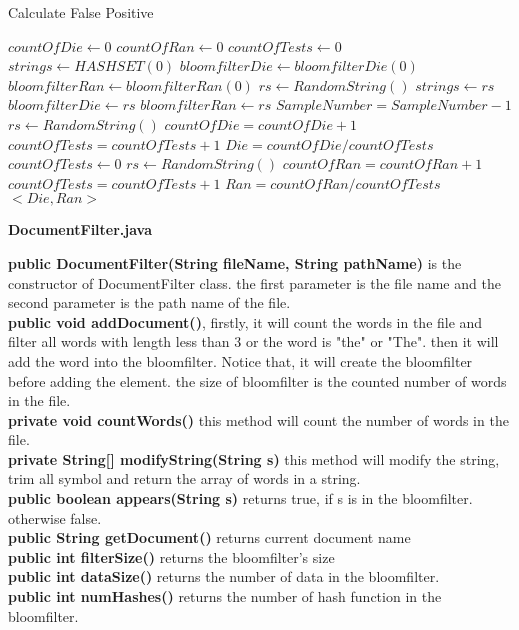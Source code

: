 \documentclass[a4paper,14pt]{article}
\begin{document}
\begin{algorithm}
\caption{Calculate False Positive}
\begin{algorithmic}
\STATE $countOfDie \gets 0$
\STATE$countOfRan \gets 0$
\STATE$countOfTests \gets 0$
\STATE$strings \gets HASHSET(0)$
\STATE$bloomfilterDie \gets bloomfilterDie(0)$
\STATE$bloomfilterRan \gets bloomfilterRan(0)$
\STATE $rs \gets RandomString()$
\STATE$strings \gets rs$
\STATE$bloomfilterDie \gets rs$
\STATE$bloomfilterRan \gets rs$
\STATE$SampleNumber = SampleNumber - 1$
\ENDWHILE
{}
\STATE $rs \gets RandomString()$
\STATE$countOfDie = countOfDie + 1 $
\ENDIF
\STATE$countOfTests = countOfTests + 1 $
\ENDWHILE
\STATE$Die = countOfDie / countOfTests$
\STATE $countOfTests \gets 0$
\STATE $rs \gets RandomString()$
\STATE$countOfRan = countOfRan + 1 $
\ENDIF
\STATE$countOfTests = countOfTests + 1 $
\ENDWHILE
\STATE$Ran = countOfRan / countOfTests$
\RETURN $<Die,Ran>$
\end{algorithmic}
\end{algorithm} 

\clearpage

\begin{center}
\textbf{{\large DocumentFilter.java}}
\end{center}
\textbf{public DocumentFilter(String fileName, String pathName) } is the constructor of DocumentFilter class. the first parameter is the file name and the second parameter is the path name of the file.
\\[6pt]
\textbf{public void addDocument()}, firstly, it will count the words in the file and filter all words with length less than 3 or the word is "the" or "The". then it will add the word into the bloomfilter. Notice that, it will create the bloomfilter before adding the element. the size of bloomfilter is the counted number of words in the file.
\\[6pt]
\textbf{private void countWords()} this method will count the number of words in the file.
\\[6pt]
\textbf{private String[] modifyString(String s)} this method will modify the string, trim all symbol and return the array of words in a string.
\\[6pt]
\textbf{public boolean appears(String s)} returns true, if s is in the bloomfilter. otherwise false.
\\[6pt]
\textbf{public String getDocument()} returns current document name
\\[6pt]
\textbf{public int filterSize()} returns the bloomfilter's size
\\[6pt]
\textbf{public int dataSize()} returns the number of data in the bloomfilter.
\\[6pt]
\textbf{public int numHashes()} returns the number of hash function in the bloomfilter.
\end{document}
